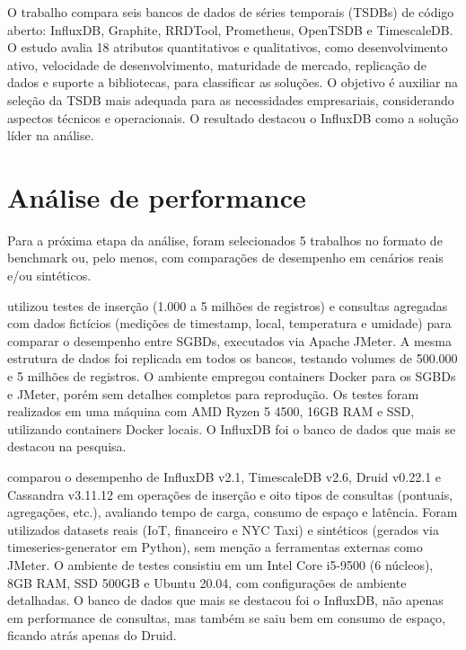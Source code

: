 O trabalho compara seis bancos de dados de séries temporais (TSDBs) de código aberto: InfluxDB, Graphite, RRDTool, Prometheus, OpenTSDB e TimescaleDB. O estudo avalia 18 atributos quantitativos e qualitativos, como desenvolvimento ativo, velocidade de desenvolvimento, maturidade de mercado, replicação de dados e suporte a bibliotecas, para classificar as soluções. O objetivo é auxiliar na seleção da TSDB mais adequada para as necessidades empresariais, considerando aspectos técnicos e operacionais. O resultado destacou o InfluxDB como a solução líder na análise.

\section{Análise de performance}

Para a próxima etapa da análise, foram selecionados 5 trabalhos no formato de benchmark ou, pelo menos, com comparações de desempenho em cenários reais e/ou sintéticos.

 utilizou testes de inserção (1.000 a 5 milhões de registros) e consultas agregadas com dados fictícios (medições de timestamp, local, temperatura e umidade) para comparar o desempenho entre SGBDs, executados via Apache JMeter. A mesma estrutura de dados foi replicada em todos os bancos, testando volumes de 500.000 e 5 milhões de registros. O ambiente empregou containers Docker para os SGBDs e JMeter, porém sem detalhes completos para reprodução. Os testes foram realizados em uma máquina com AMD Ryzen 5 4500, 16GB RAM e SSD, utilizando containers Docker locais. O InfluxDB foi o banco de dados que mais se destacou na pesquisa.

 comparou o desempenho de InfluxDB v2.1, TimescaleDB v2.6, Druid v0.22.1 e Cassandra v3.11.12 em operações de inserção e oito tipos de consultas (pontuais, agregações, etc.), avaliando tempo de carga, consumo de espaço e latência. Foram utilizados datasets reais (IoT, financeiro e NYC Taxi) e sintéticos (gerados via timeseries-generator em Python), sem menção a ferramentas externas como JMeter. O ambiente de testes consistiu em um Intel Core i5-9500 (6 núcleos), 8GB RAM, SSD 500GB e Ubuntu 20.04, com configurações de ambiente detalhadas. O banco de dados que mais se destacou foi o InfluxDB, não apenas em performance de consultas, mas também se saiu bem em consumo de espaço, ficando atrás apenas do Druid.

